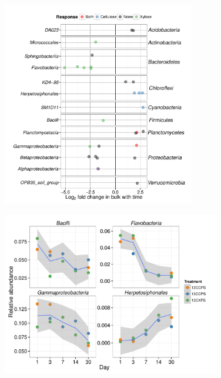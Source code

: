 \begin{figure}[H] \begin{center}
\centerline{\includegraphics[width=0.75\textwidth]{figures/l2fc_time/l2fc_time.pdf}}
\caption{\protect}\label{fig:time}
\end{center} \end{figure}

\begin{figure}[H]
	\begin{center}
    \centerline{\includegraphics[width=0.85\textwidth]{figures/abndVtime_class/abndVtime_class.pdf}}
	\caption{\protect}\label{fig:time_class}
    \end{center}
\end{figure}

